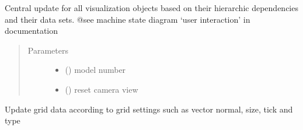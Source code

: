 \documentclass[letterpaper,10pt,english]{sphinxmanual}
\begin{document}
\begin{fulllineitems}
\begin{fulllineitems}
\end{fulllineitems}


\begin{fulllineitems}
\label{\detokenize{api:beamon.ui.pyvista_widget.PyVistaWidget.update_global}}
Central update for all visualization objects based on their hierarchic dependencies and their data sets.
@see machine state diagram ‘user interaction’ in documentation
\begin{quote}\begin{description}
\item[{Parameters}] \leavevmode\begin{itemize}
\item {} 
 () \textendash{} model number

\item {} 
 () \textendash{} reset camera view

\end{itemize}

\end{description}\end{quote}

\end{fulllineitems}


\begin{fulllineitems}
\label{\detokenize{api:beamon.ui.pyvista_widget.PyVistaWidget.update_grid}}
Update grid data according to grid settings such as vector normal, size, tick and type

\end{fulllineitems}



\end{fulllineitems}
\end{document}
